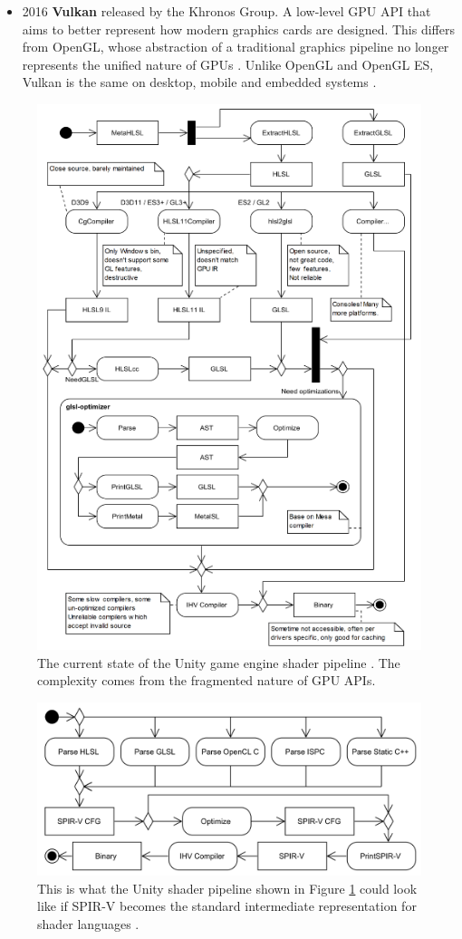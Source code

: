 \documentclass[a4paper,12pt,twoside,openright]{report}
\begin{document}
\begin{itemize}
    \item 2016 \textbf{Vulkan} released by the Khronos Group. A low-level GPU
    API that aims to better represent how modern graphics cards are designed.
    This differs from OpenGL, whose abstraction of a traditional graphics
    pipeline no longer represents the unified nature of GPUs
    \cite{VulkanAnnouncement}. Unlike OpenGL and OpenGL ES, Vulkan is the same
    on desktop, mobile and embedded systems \cite{Vulkan}.

\end{itemize}

\begin{figure}[h]
\centering
\includegraphics[width=0.6\linewidth]{unity_shader_madness}
\caption{The current state of the Unity game engine shader pipeline
\cite{UnityShaderPipeline}. The complexity comes from the fragmented nature
of GPU APIs.}
\label{fig:unity_shader_madness}
\end{figure}

\begin{figure}[h]
\centering
\includegraphics[width=0.8\linewidth]{unity_shader_sanity}
\caption{This is what the Unity shader pipeline shown in Figure
\ref{fig:unity_shader_madness} could look like if SPIR-V becomes the standard
intermediate representation for shader languages \cite{UnityShaderPipeline}.}
\label{fig:unity_shader_sanity}
\end{figure}
\end{document}
